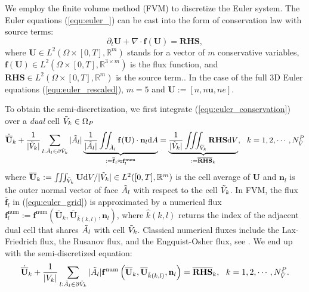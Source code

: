 \documentclass{article}
\begin{document}
We employ the finite volume method (FVM) to discretize the Euler system. The Euler
equations (\ref{equ:euler_}) can be cast into the form of conservation law with source
terms:
\begin{equation} \label{equ:euler_conservation}
    \partial_t \mathbf{U} + \nabla \cdot \mathbf{f}(\mathbf{U}) = \mathbf{RHS},
\end{equation}
where $\mathbf{U} \in L^2(\Omega \times [0,T], \mathbb{R}^m)$ stands for a vector of $m$
conservative variables,
$\mathbf{f}(\mathbf{U}) \in L^2(\Omega \times [0,T], \mathbb{R}^{3 \times m})$ is the flux
function, and $\mathbf{RHS} \in L^2(\Omega \times [0,T], \mathbb{R}^m)$ is the source
term.. In the case of the full 3D Euler equations (\ref{equ:euler_rescaled}), $m = 5$ and
$\mathbf{U} := [n, n\mathbf{u}, ne]$.

To obtain the semi-discretization, we first integrate (\ref{equ:euler_conservation}) over
a \emph{dual} cell $\Tilde{V}_k \in \Omega_P$
\begin{equation} \label{equ:euler_grid} 
    \dot{\overline{\mathbf{U}}}_k + \frac{1}{|\Tilde{V}_k|}\sum_{l:\Tilde{A}_l\in\partial \Tilde{V}_k} |\Tilde{A}_l|\underbrace{\frac{1}{|\Tilde{A}_l|}\iint_{\Tilde{A}_l}\mathbf{f}(\mathbf{U})\cdot \mathbf{n}_l \text{d}A}_{:= \overline{\mathbf{f}}_l \approx \mathbf{f}^\text{num}_l} = \underbrace{\frac{1}{|\Tilde{V}_k|}\iiint_{\Tilde{V}_k} \mathbf{RHS} \text{d}V}_{:= \overline{\mathbf{RHS}}_k},\ \ k = 1,2,\cdots,N_{\Tilde{V}}^P
\end{equation}
where
$\overline{\mathbf{U}}_k := \iiint_{\Tilde{V}_k} \mathbf{U} \text{d}V / |\Tilde{V}_k| \in
L^2([0,T],\mathbb{R}^m)$ is the cell average of $\mathbf{U}$ and $\mathbf{n}_l$ is the
outer normal vector of face $\Tilde{A}_l$ with respect to the cell $\Tilde{V}_k$. In FVM,
the flux $\overline{\mathbf{f}}_l$ in (\ref{equ:euler_grid}) is approximated by a
numerical flux
$\mathbf{f}^\text{num}_l := \mathbf{f}^\text{num}\left(\overline{\mathbf{U}}_k,
  \overline{\mathbf{U}}_{\hat{k}(k,l)}, \mathbf{n}_l\right)$, where $\hat{k}(k,l)$ returns
the index of the adjacent dual cell that shares $\Tilde{A}_l$ with cell
$\Tilde{V}_k$. Classical numerical fluxes include the Lax-Friedrich flux, the Rusanov
flux, and the Engquist-Osher flux, see \cite[][pp. 44-46]{mishra_2019}. We end up with the
semi-discretized equation:
\begin{equation}
  \dot{\overline{\mathbf{U}}}_k + \frac{1}{|V_k|}\sum_{l:\Tilde{A}_l\in\partial \Tilde{V}_k} |\Tilde{A}_l| \mathbf{f}^\text{num}\left(\overline{\mathbf{U}}_k, \overline{\mathbf{U}}_{\hat{k}(k,l)}, \mathbf{n}_l\right) = \overline{\mathbf{RHS}}_k,\ \  k = 1,2,\cdots,N_{\Tilde{V}}^P.
    \label{equ:fvm}
\end{equation}
\end{document}
